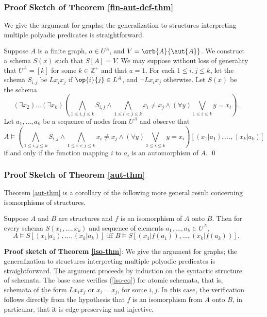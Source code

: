 \subsubsection{Proof Sketch of Theorem \ref{fin-aut-def-thm}}

We give the argument for graphs; the generalization to structures interpreting multiple polyadic predicates is straightforward.

Suppose $A$ is a finite graph, $a\in U^A$, and $V=\orb{A}{\aut{A}}$. We construct a schema $S(x)$ such that $S[A]=V$. We may suppose without loss of generality that $U^A=[k]$ for some $k\in\mathbb{Z}^+$ and that $a=1$. For each $1\leq i,j\leq k$, let the schema $S_{i,j}$ be $Lx_ix_j$ if $\op{i}{j}\in L^A$, and $\neg Lx_ix_j$ otherwise. Let $S(x)$ be the schema
\[
(\exists x_2)\ldots(\exists x_k)(\bigwedge_{1\leq i,j\leq k}S_{i,j}\wedge\bigwedge_{1\leq i<j\leq k}x_i\neq x_j\wedge(\forall y)\bigvee_{1\leq i\leq k} y=x_i).
\] 
Let $a_1,\dots,a_k$ be a sequence of nodes from $U^A$ and observe that
\[
A\models(\bigwedge_{1\leq i,j\leq k}S_{i,j}\wedge\bigwedge_{1\leq i<j\leq k}x_i\neq x_j\wedge(\forall y)\bigvee_{1\leq i\leq k} y=x_i)[(x_1|a_1),\ldots,(x_k|a_k)]
\]
if and only if the function mapping $i$ to $a_i$ is an automorphism of $A$. \qed
\subsubsection{Proof Sketch of Theorem \ref{aut-thm}}

Theorem \ref{aut-thm} is a corollary of the following more general result concerning isomorphisms of structures.
\begin{theorem}\label{iso-thm}
Suppose $A$ and $B$ are structures and $f$ is an isomorphism of $A$ onto $B$. Then for every schema $S(x_1,\ldots,x_k)$ and sequence of elements $a_1,\dots,a_k\in U^A$,
\begin{equation}\label{iso-eq}
A\models S[(x_1|a_1),\ldots,(x_k|a_k)]\mbox{ iff }B\models S[(x_1|f(a_1)),\ldots,(x_k|f(a_k))].
\end{equation}
\end{theorem}

{\bf Proof sketch of Theorem \ref{iso-thm}}:
We give the argument for graphs; the generalization to structures interpreting multiple polyadic predicates is straightforward.
The argument proceeds by induction on the syntactic structure of schemata. The base case verifies (\ref{iso-eq}) for atomic schemata, that is, schemata of the form $Lx_ix_j$ or $x_i=x_j$, for some $i,j$. In this case, the verification follows directly from the hypothesis that $f$ is an isomorphism from $A$ onto $B$, in particular, that it is edge-preserving and injective.

